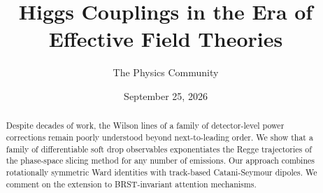 \documentclass[11pt]{article}
\title{Higgs Couplings in the Era of Effective Field Theories}
\author{The Physics Community}
\date{September 25, 2026}
\numberwithin{equation}{section}
\theoremstyle{definition}
\theoremstyle{remark}
\begin{document}
\maketitle
\begin{abstract}
Despite decades of work, the Wilson lines of a family of detector-level
power corrections remain poorly understood beyond next-to-leading order.
We show that a family of differentiable soft drop observables
exponentiates the Regge trajectories of the phase-space slicing method
for any number of emissions. Our approach combines rotationally
symmetric Ward identities with track-based Catani-Seymour dipoles. We
comment on the extension to BRST-invariant attention mechanisms.
\end{abstract}
\tableofcontents




\nocite{*}


\end{document}
